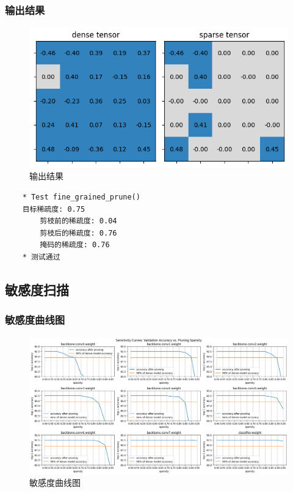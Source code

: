 \documentclass{article}
\begin{document}
\subsubsection{输出结果}

\begin{figure}[H]
    \centering
    \includegraphics[width=1\textwidth]{output1.png}
    \caption{输出结果}
\end{figure}

\begin{verbatim}
    * Test fine_grained_prune()
    目标稀疏度: 0.75
        剪枝前的稀疏度: 0.04
        剪枝后的稀疏度: 0.76
        掩码的稀疏度: 0.76
    * 测试通过
\end{verbatim}

\subsection{敏感度扫描}

\subsubsection{敏感度曲线图}

\begin{figure}[H]
    \centering
    \includegraphics[width=1\textwidth]{output3.png}
    \caption{敏感度曲线图}
\end{figure}
\end{document}
